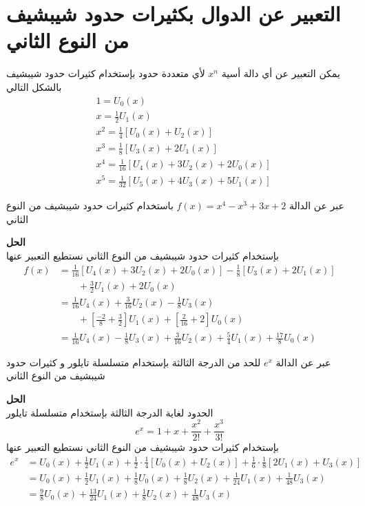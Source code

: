 
\section{التعبير عن الدوال  بكثيرات حدود شيبشيف من النوع الثاني}  
يمكن التعبير عن أي دالة أسية $x^n$ لأي متعددة حدود بإستخدام كثيرات حدود شيبشيف بالشكل التالي
\begin{align*}
	&1 = U_0(x)\\
	&x = \frac{1}{2}U_1(x)\\
	&x^2 = \frac{1}{4} [U_0(x) + U_2(x)]\\
	&x^3 = \frac{1}{8} [U_3(x) + 2U_1(x)]\\
	&x^4 = \frac{1}{16}[U_4(x) + 3U_2(x) + 2U_0(x)]\\
	&x^5 = \frac{1}{32} [U_5(x) + 4U_3(x) + 5U_1(x) ]
\end{align*}

\begin{example}
	عبر عن الدالة $f(x) = x^4 - x^3 + 3x+2$ باستخدام كثيرات حدود شيبشيف من النوع الثاني
\end{example}
\noindent
\textbf{الحل}\\
\noindent
بإستخدام كثيرات حدود شيبشيف من النوع الثاني نستطيع التعبير عنها
\begin{align*}
	f(x) &= \frac{1}{16}[U_4(x) + 3U_2(x) + 2U_0(x)] - \frac{1}{8} [U_3(x) + 2U_1(x)] \\
	&\qquad + \frac{3}{2}U_1(x) + 2U_0(x) \\[5pt]
	&= \frac{1}{16}U_4(x) + \frac{3}{16}U_2(x) - \frac{1}{8}U_3(x)\\
	&\qquad + \left[\frac{-2}{8}+\frac{3}{2}\right]U_1(x) + \left[\frac{2}{16}+2\right]U_0(x)\\[5pt]
	&= \frac{1}{16}U_4(x) - \frac{1}{8}U_3(x) + \frac{3}{16}U_2(x) + \frac{5}{4}U_1(x) + \frac{17}{8}U_0(x)
\end{align*}

\begin{example}
	عبر عن الدالة $e^x$ للحد من الدرجة الثالثة بإستخدام متسلسلة تايلور و كثيرات حدود شيبشيف من النوع الثاني
\end{example}
\noindent
\textbf{الحل}\\
\noindent
الحدود لغاية الدرجة الثالثة بإستخدام متسلسلة تايلور 
\[
e^x = 1 + x + \frac{x^2}{2!} + \frac{x^3}{3!}
\]
بإستخدام كثيرات حدود شيبشيف من النوع الثاني نستطيع التعبير عنها
\begin{align*}
	e^x &= U_0(x) + \frac{1}{2}U_1(x) + \frac{1}{2}\cdot\frac{1}{4}[U_0(x) + U_2(x)] + \frac{1}{6}\cdot\frac{1}{8}[2U_1(x) + U_3(x)]\\
	&= U_0(x) + \frac{1}{2}U_1(x) + \frac{1}{8}U_0(x) + \frac{1}{8}U_2(x) + \frac{1}{24}U_1(x) + \frac{1}{48}U_3(x)\\
	&= \frac{9}{8}U_0(x) + \frac{13}{24}U_1(x) + \frac{1}{8}U_2(x) + \frac{1}{48}U_3(x)
\end{align*}

